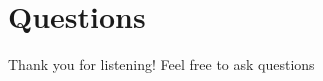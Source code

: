 \section{Questions}

\begin{frame}
  \centering

  \huge Thank you for listening!
  \vskip 1cm
  \large Feel free to ask questions

\end{frame}

